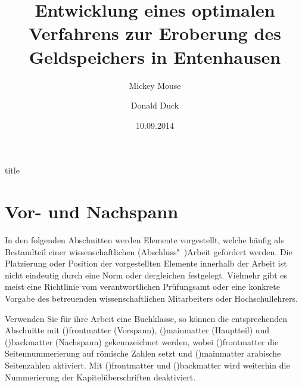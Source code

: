 \documentclass[%
  english,ngerman,%
  cdgeometry=no,DIV=12,%
  cd=false,cdfont=false,cdtitle=true,%
  headings=normal,%
  automark,%
  listof=toc,%
]{tudscrartcl}
\begin{document}
\begin{Trunk!}{title}
\title{%
  Entwicklung eines optimalen Verfahrens zur Eroberung des
  Geldspeichers in Entenhausen
}
\author{%
  Mickey Mouse%
\and%
  Donald Duck%
}
\date{10.09.2014}
\makecover
\maketitle

\end{Trunk!}



\section{Vor- und Nachspann}

In den folgenden Abschnitten werden Elemente vorgestellt, welche häufig 
als Bestandteil einer wissenschaftlichen (Abschluss"~)Arbeit gefordert werden. 
Die Platzierung oder Position der vorgestellten Elemente innerhalb der Arbeit 
ist nicht eindeutig durch eine Norm oder dergleichen festgelegt. Vielmehr gibt 
es meist eine Richtlinie vom verantwortlichen Prüfungsamt oder eine konkrete 
Vorgabe des betreuenden wissenschaftlichen Mitarbeiters oder Hochschullehrers.

Verwenden Sie für ihre Arbeit eine Buchklasse, so können die entsprechenden 
Abschnitte mit \Macro(){frontmatter} (Vorspann), 
\Macro(){mainmatter} (Hauptteil) und 
\Macro(){backmatter} (Nachspann) gekennzeichnet werden, 
wobei \Macro(){frontmatter} die Seitennummerierung auf 
römische Zahlen setzt und \Macro(){mainmatter} arabische 
Seitenzahlen aktiviert. Mit \Macro(){frontmatter} und 
\Macro(){backmatter} wird weiterhin die Nummerierung der 
Kapitelüberschriften deaktiviert.
\end{document}
